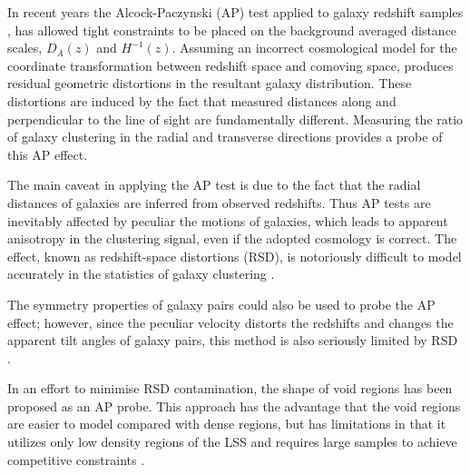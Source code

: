 \documentclass{natureprintstyle}
\let\citep\cite
\begin{document}
In recent years the Alcock-Paczynski (AP) test \citep{AP1979} applied to galaxy redshift samples \citep{Outram2004,Blake2011,Alam2016}, 
has allowed tight constraints to be placed on the background averaged distance scales, $D_A(z)$ and $H^{-1}(z)$.  
Assuming an incorrect cosmological model for the coordinate transformation between redshift space and comoving space, produces residual geometric distortions in the resultant galaxy distribution. 
These distortions are induced by the fact that measured distances along 
and perpendicular to the line of sight are fundamentally different. 
Measuring the ratio of galaxy clustering in the radial and transverse directions provides a probe of this AP effect.


The main caveat in applying the AP test is due to the fact that 
the radial distances of galaxies are inferred from observed redshifts.
Thus AP tests are inevitably affected by peculiar the motions of galaxies,
which leads to apparent anisotropy in the clustering signal, even if the adopted cosmology is correct.
The effect, known as redshift-space distortions (RSD),
is notoriously difficult to model accurately in the statistics of galaxy clustering \citep{Ballinger1996}.

The symmetry properties of galaxy pairs\cite{Marinoni2010}  could also be used to probe the AP effect;
however, since the peculiar velocity distorts the redshifts and changes the apparent tilt angles of galaxy pairs,
this method is also seriously limited by RSD \citep{Jennings2011}.

In an effort to minimise RSD contamination, the shape of void regions\cite{Ryden1995,LavausWandelt1995}  has been 
proposed as an AP probe. This approach has the advantage that the void regions are easier to model compared with dense regions, but has limitations in that it utilizes only low density regions of the LSS and requires large samples to achieve competitive constraints \citep{Qingqing2016}.

\end{document}
